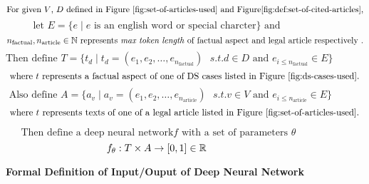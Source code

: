 \begin{figure}[ht]
    \[\text{For given $V$, $D$ defined in Figure \ref{fig:set-of-articles-used} and  Figure\ref{fig:def:set-of-cited-articles},}\]
    \[\text{ let } E = \{e \mid e \text{ is an english word or special charcter} \} \text{ and }\]
    \[n_{\text{factual}}, n_{\text{article}} \in \Bbb N \text{ represents \textit{max token length} of factual aspect and legal article respectively }. \]
    \[\text{Then define } T = \{t_d \mid t_d = (e_1, e_2, \ldots , e_{n_\text{factual}}) \text{ } s.t. d \in D \text{ and } e_{i \le{n_{\text{factual}}}  } \in E \} \]
    \[\text{ where } t \text{ represents a factual aspect of one of DS cases listed in Figure \ref{fig:ds-cases-used}. }\]
    \[\text{ Also define } A = \{a_v \mid a_v = (e_1, e_2, \ldots , e_{n_\text{article}}) \text{ } s.t. v \in V \text{ and } e_{i \le{n_{\text{article}}}  } \in E \}  \]
    \[\text{ where } t \text{ represents texts of one of a legal article listed in Figure \ref{fig:set-of-articles-used}. }\]

    \[\text{ Then define a deep neural network} f \text{ with a set of parameters } \theta \]
    \[f_{\theta}: T \times A \to [0, 1] \in \Bbb R \]


    \caption{\textbf{Formal Definition of Input/Ouput of Deep Neural Network}}
    \label{fig:def:io:nn}

\end{figure}